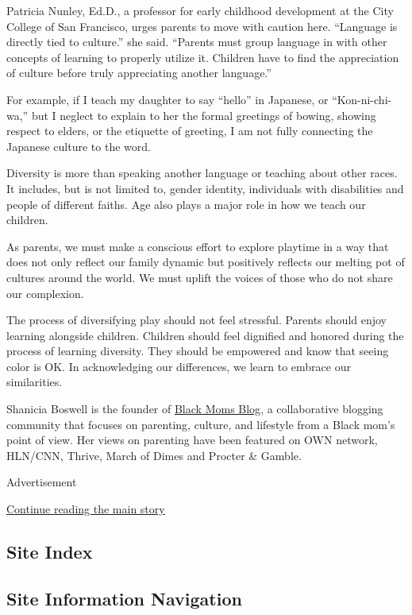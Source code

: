 Patricia Nunley, Ed.D., a professor for early childhood development at
the City College of San Francisco, urges parents to move with caution
here. ``Language is directly tied to culture.'' she said. ``Parents must
group language in with other concepts of learning to properly utilize
it. Children have to find the appreciation of culture before truly
appreciating another language.''

For example, if I teach my daughter to say ``hello'' in Japanese, or
``Kon-ni-chi-wa,'' but I neglect to explain to her the formal greetings
of bowing, showing respect to elders, or the etiquette of greeting, I am
not fully connecting the Japanese culture to the word.

Diversity is more than speaking another language or teaching about other
races. It includes, but is not limited to, gender identity, individuals
with disabilities and people of different faiths. Age also plays a major
role in how we teach our children.

As parents, we must make a conscious effort to explore playtime in a way
that does not only reflect our family dynamic but positively reflects
our melting pot of cultures around the world. We must uplift the voices
of those who do not share our complexion.

The process of diversifying play should not feel stressful. Parents
should enjoy learning alongside children. Children should feel dignified
and honored during the process of learning diversity. They should be
empowered and know that seeing color is OK. In acknowledging our
differences, we learn to embrace our similarities.

Shanicia Boswell is the founder of
\href{https://blackmomsblog.com/}{Black Moms Blog}, a collaborative
blogging community that focuses on parenting, culture, and lifestyle
from a Black mom's point of view. Her views on parenting have been
featured on OWN network, HLN/CNN, Thrive, March of Dimes and Procter \&
Gamble.

Advertisement

\protect\hyperlink{after-bottom}{Continue reading the main story}

\hypertarget{site-index}{%
\subsection{Site Index}\label{site-index}}

\hypertarget{site-information-navigation}{%
\subsection{Site Information
Navigation}\label{site-information-navigation}}

